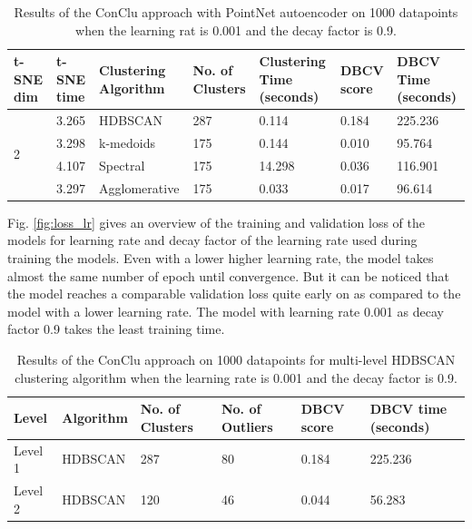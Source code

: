 \begin{table}[H]
  \setlength\extrarowheight{10pt}
  \caption{Results of the ConClu approach with PointNet autoencoder on 1000 datapoints when the learning rat is 0.001 and the decay factor is 0.9. }
  \centering
  \begin{tabular}{|p{30pt}|p{50pt}|p{60pt}|p{50pt}|p{50pt}|p{50pt}|p{40pt}|}
    \toprule
    \ac{t-SNE} dim	& \ac{t-SNE} time & Clustering Algorithm & No. of Clusters & Clustering Time (seconds) & \ac{DBCV} score & \ac{DBCV} Time (seconds)\\
    \midrule
    \multirow{4}{30pt}{2}	& 3.265	& \ac{HDBSCAN}	& 287	& 0.114	& 0.184	& 225.236 \\ \cline{2-7} 
    & 3.298	& k-medoids	& 175	& 0.144	& 0.010	& 95.764 \\ \cline{2-7} 
    & 4.107	& Spectral	& 175	& 14.298	& 0.036	& 116.901 \\ \cline{2-7}
    & 3.297	& Agglomerative	& 175	& 0.033	& 0.017	& 96.614 \\ 
    \bottomrule
  \end{tabular}
  \label{tab:conclu_lr_decay_9}
\end{table}

Fig. \ref{fig:loss_lr} gives an overview of the training and validation loss of the models for learning rate and decay factor of the learning rate used during training the models. Even with a lower higher learning rate, the model takes almost the same number of epoch until convergence. But it can be noticed that the model reaches a comparable validation loss quite early on as compared to the model with a lower learning rate. The model with learning rate  0.001 as decay factor 0.9 takes the least training time. 

\begin{table}[H]
  \setlength\extrarowheight{10pt}
  \caption{Results of the ConClu approach on 1000 datapoints for multi-level \ac{HDBSCAN} clustering algorithm when the learning rate is 0.001 and the decay factor is 0.9. }
  \centering
  \begin{tabular}{|l|l|l|l|l|l|}
    \toprule
    Level & Algorithm	& No. of Clusters	& No. of Outliers	& DBCV score	& \ac{DBCV} time (seconds)	\\  
    \midrule
    Level 1 & \ac{HDBSCAN} & 287	& 80	& 0.184	& 225.236 \\ \cline{1-6}
    Level 2 & \ac{HDBSCAN} & 120	& 46	& 0.044	& 56.283 \\ 
    \bottomrule
  \end{tabular}
  \label{tab:conclu_lr_decay_9_levels}
\end{table}

